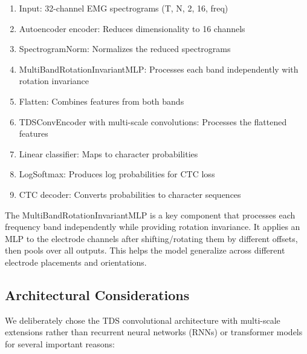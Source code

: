\begin{enumerate}
    \item Input: 32-channel EMG spectrograms (T, N, 2, 16, freq)
    \item Autoencoder encoder: Reduces dimensionality to 16 channels
    \item SpectrogramNorm: Normalizes the reduced spectrograms
    \item MultiBandRotationInvariantMLP: Processes each band independently with rotation invariance
    \item Flatten: Combines features from both bands
    \item TDSConvEncoder with multi-scale convolutions: Processes the flattened features
    \item Linear classifier: Maps to character probabilities
    \item LogSoftmax: Produces log probabilities for CTC loss
    \item CTC decoder: Converts probabilities to character sequences
\end{enumerate}

The MultiBandRotationInvariantMLP is a key component that processes each frequency band independently while providing rotation invariance. It applies an MLP to the electrode channels after shifting/rotating them by different offsets, then pools over all outputs. This helps the model generalize across different electrode placements and orientations.

\subsection{Architectural Considerations}

We deliberately chose the TDS convolutional architecture with multi-scale extensions rather than recurrent neural networks (RNNs) or transformer models for several important reasons:

